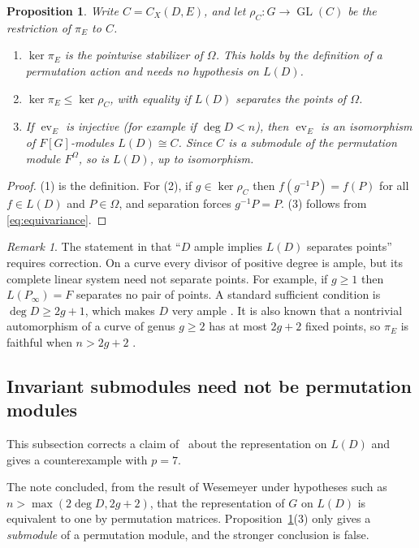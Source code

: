 \documentclass[12pt,letterpaper]{article}
\newtheorem{proposition}[theorem]{Proposition}
\theoremstyle{definition}
\theoremstyle{remark}
\newtheorem{remark}[theorem]{Remark}
\numberwithin{equation}{section}
\newcommand{\ev}{\operatorname{ev}}
\newcommand{\GL}{\operatorname{GL}}
\begin{document}
\begin{proposition}\label{prop:actions}
Write $C=C_X(D,E)$, and let $\rho_C:G\to\GL(C)$ be the restriction of
$\pi_E$ to $C$.
\begin{enumerate}
\item $\ker\pi_E$ is the pointwise stabilizer of $\Omega$.  This holds by
the definition of a permutation action and needs no hypothesis on $L(D)$.
\item $\ker\pi_E\le\ker\rho_C$, with equality if $L(D)$ separates the
points of $\Omega$.
\item If $\ev_E$ is injective (for example if $\deg D<n$), then $\ev_E$
is an isomorphism of $F[G]$-modules $L(D)\cong C$.  Since $C$ is a
submodule of the permutation module $F^\Omega$, so is $L(D)$, up to
isomorphism.
\end{enumerate}
\end{proposition}
\begin{proof}
(1) is the definition.  For (2), if $g\in\ker\rho_C$ then
$f(g^{-1}P)=f(P)$ for all $f\in L(D)$ and $P\in\Omega$, and separation
forces $g^{-1}P=P$.  (3) follows from \eqref{eq:equivariance}.
\end{proof}

\begin{remark}\label{rem:separation}
The statement in \cite{Jo05} that ``$D$ ample implies $L(D)$ separates
points'' requires correction.  On a curve every divisor of positive
degree is ample, but its complete linear system need not separate points.
For example, if $g\ge1$ then $L(P_\infty)=F$ separates no pair of points.
A standard sufficient condition is $\deg D\ge2g+1$, which makes $D$ very
ample \cite[Cor.~IV.3.2]{Ha77}.  It is also known that a nontrivial
automorphism of a curve of genus $g\ge2$ has at most $2g+2$ fixed points,
so $\pi_E$ is faithful when $n>2g+2$ \cite[\S VII.3]{St93}.
\end{remark}

\subsection{Invariant submodules need not be permutation modules}
\label{subsec:not-perm}

This subsection corrects a claim of~\cite{Jo05} about the representation
on $L(D)$ and gives a counterexample with $p=7$.

The note \cite{Jo05} concluded, from the result of Wesemeyer \cite{We98}
under hypotheses such as $n>\max(2\deg D,2g+2)$, that the representation
of $G$ on $L(D)$ is equivalent to one by permutation matrices.
Proposition~\ref{prop:actions}(3) only gives a \emph{submodule} of a
permutation module, and the stronger conclusion is false.
\end{document}
